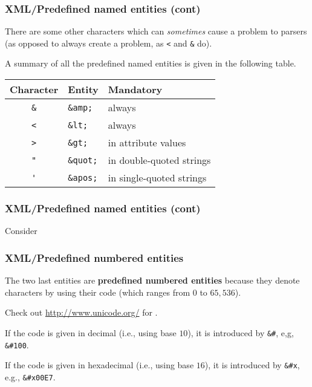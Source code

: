%
\begin{frame}[containsverbatim]
\frametitle{XML/Predefined named entities (cont)}

There are some other characters which can \emph{sometimes} cause a
problem to \XML parsers (as opposed to always create a problem, as
\verb|<| and \verb|&| do). 

\bigskip

A summary of all the predefined named entities is given in the
following table.
\begin{center}
\begin{tabular}{cll}
\toprule
Character & Entity & Mandatory\\
\midrule
\verb|&| & \verb|&amp;|  & always\\
\verb|<| & \verb|&lt;|   & always\\
\verb|>| & \verb|&gt;|   & in attribute values\\
\verb|"| & \verb|&quot;| & in double-quoted strings\\
\verb|'| & \verb|&apos;| & in single-quoted strings\\
\bottomrule
\end{tabular}
\end{center}

\end{frame}

%
\begin{frame}
\frametitle{XML/Predefined named entities (cont)}

Consider

\end{frame}

%
\begin{frame}[containsverbatim]
\frametitle{XML/Predefined numbered entities}

The two last entities are \textbf{predefined numbered entities} because
they denote characters by using their \Unicode code (which ranges from
\(0\) to \(65,536\)). 

\bigskip

Check out \url{http://www.unicode.org/} for \Unicode.

\bigskip

If the code is given in decimal (i.e., using base \(10\)), it is
introduced by \verb|&#|, e,g, \verb|&#100|.

\bigskip

If the code is given in hexadecimal (i.e., using base \(16\)), it is
introduced by \verb|&#x|, e.g., \verb|&#x00E7|.

\end{frame}

